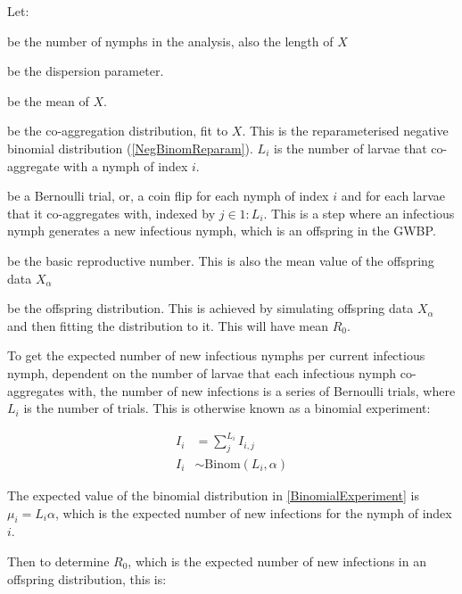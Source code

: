 \documentclass{article}
\begin{document}
Let:

\begin{description}[leftmargin=1cm, style=nextline]
	\item[$ n $] be the number of nymphs in the analysis, also the length of $ X $
	\item[$ k $] be the dispersion parameter.
	\item [$ m = \frac{1}{n} \sum_i^n L_i $] be the mean of $ X $.
	\item [$ L_i \sim \text{NB}(X | m, k) $] be the co-aggregation distribution, fit to $ X $. This is the reparameterised negative binomial distribution (\ref{NegBinomReparam}).
	$ L_i $ is the number of larvae that co-aggregate with a nymph of index $ i $.
	\item [$ I_{i,j} \sim \text{Bern}(p=\alpha) $] be a Bernoulli trial, or, a coin flip for each nymph of index $ i $ and for each larvae that it co-aggregates with, indexed by $ j \in 1:L_i $. This is a step where an infectious nymph generates a new infectious nymph, which is an offspring in the GWBP.
	\item [$ R_0 $] be the basic reproductive number. This is also the mean value of the offspring data $ X_\alpha $
	\item [$ Z \sim \text{NB}(X_\alpha|m=R_0, k) $] be the offspring distribution. This is achieved by  simulating offspring data $ X_\alpha $ and then fitting the distribution to it. This will have mean $ R_0 $.
\end{description}

To get the expected number of new infectious nymphs per current infectious nymph, dependent on the number of larvae that each infectious nymph co-aggregates with, the number of new infections is a series of Bernoulli trials, where $ L_i $ is the number of trials. This is otherwise known as a binomial experiment:

\begin{align}
    I_i &= \sum_j^{L_i} I_{i,j} \nonumber \\
    I_i &\sim \text{Binom}(L_i,\alpha)\label{BinomialExperiment}
\end{align}

The expected value of the binomial distribution in \eqref{BinomialExperiment} is $ \mu_i = L_i \alpha $, which is the expected number of new infections for the nymph of index $ i $.

Then to determine $ R_0 $, which is the expected number of new infections in an offspring distribution, this is:
\end{document}

